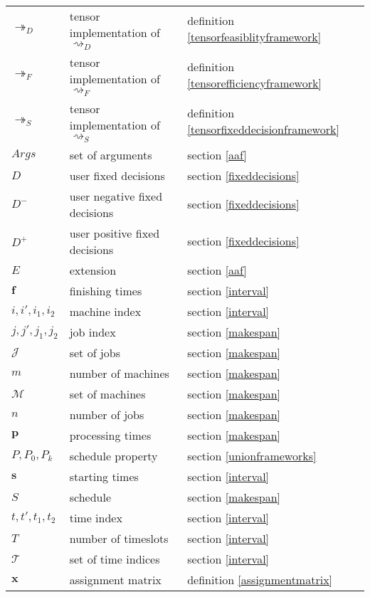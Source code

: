 \begin{tabular}{l l l}
	$\twoheadrightarrow_D$ & tensor implementation of $\rightsquigarrow_D$ & definition \ref{tensorfeasiblityframework} \\
	$\twoheadrightarrow_F$ & tensor implementation of $\rightsquigarrow_F$ & definition \ref{tensorefficiencyframework} \\
	$\twoheadrightarrow_S$ & tensor implementation of $\rightsquigarrow_S$ & definition \ref{tensorfixeddecisionframework} \\
	$Args$ & set of arguments & section \ref{aaf}\\
	$D$ & user fixed decisions & section \ref{fixeddecisions} \\
	$D^-$ & user negative fixed decisions & section \ref{fixeddecisions} \\
	$D^+$ & user positive fixed decisions & section \ref{fixeddecisions} \\
	$E$ & extension & section \ref{aaf} \\
	$\mathbf{f}$ & finishing times & section \ref{interval} \\
	$i,i',i_1,i_2$ & machine index & section \ref{interval} \\
	$j,j',j_1,j_2$ & job index & section \ref{makespan} \\
	$\mathcal{J}$ & set of jobs & section \ref{makespan} \\
	$m$ & number of machines & section \ref{makespan} \\
	$\mathcal{M}$ & set of machines & section \ref{makespan} \\
	$n$ & number of jobs & section \ref{makespan} \\
	$\mathbf{p}$ & processing times & section \ref{makespan} \\
	$P,P_0,P_k$ & schedule property & section \ref{unionframeworks} \\
	$\mathbf{s}$ & starting times & section \ref{interval} \\
	$S$ & schedule & section \ref{makespan} \\
	$t,t',t_1,t_2$ & time index & section \ref{interval} \\ 
	$T$ & number of timeslots & section \ref{interval} \\
	$\mathcal{T}$ & set of time indices & section \ref{interval} \\
	$\mathbf{x}$ & assignment matrix & definition \ref{assignmentmatrix} \\
\end{tabular}

\vspace{-1.5\baselineskip}